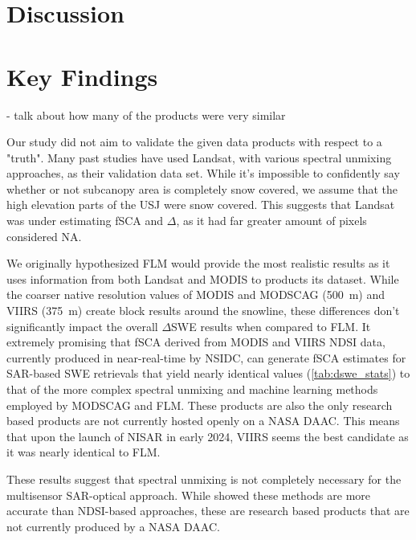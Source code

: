 \hypertarget{ch5-discussion}{\section{Discussion}\label{ch4-discussion}}
\hypertarget{ch5-discussion-1}{\section{Key Findings}\label{ch4-discussion}}


- talk about how many of the products were very similar

Our study did not aim to validate the given data products with respect to a "truth". Many past studies have used Landsat, with various spectral unmixing approaches, as their validation data set. While it's impossible to confidently say whether or not subcanopy area is completely snow covered, we assume that the high elevation parts of the USJ were snow covered. This suggests that Landsat was under estimating fSCA and $\Delta$, as it had far greater amount of pixels considered NA.

We originally hypothesized FLM would provide the most realistic results as it uses information from both Landsat and MODIS to products its dataset. While the coarser native resolution values of MODIS and MODSCAG (500~m) and VIIRS (375~m) create block results around the snowline, these differences don't significantly impact the overall $\Delta$SWE results when compared to FLM. It extremely promising that fSCA derived from MODIS and VIIRS NDSI data, currently produced in near-real-time by NSIDC, can generate fSCA estimates for SAR-based SWE retrievals that yield nearly identical values (\ref{tab:dswe_stats}) to that of the more complex spectral unmixing and machine learning methods employed by MODSCAG and FLM. These products are also the only research based products are not currently hosted openly on a NASA DAAC. This means that upon the launch of NISAR in early 2024, VIIRS seems the best candidate as it was nearly identical to FLM.


These results suggest that spectral unmixing is not completely necessary for the multisensor SAR-optical approach. While \cite{stillingerLandsatMODISVIIRS2023a} showed these methods are more accurate than NDSI-based approaches, these are research based products that are not currently produced by a NASA DAAC. 

